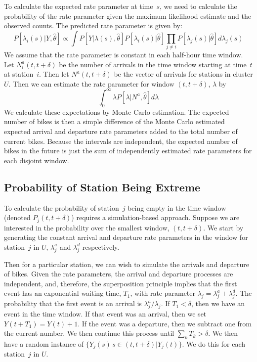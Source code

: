\documentclass{acm_proc_article-sp}
\begin{document}
To calculate the expected rate parameter at time~$s$, we need to calculate the probability of the rate parameter given the maximum likelihood estimate and the observed counts. The predicted rate parameter is given by:
\begin{equation*}
P [ \lambda_i (s) | Y, \hat{\theta} ] \propto \int P [ Y | \lambda (s), \hat{\theta} ] P [ \lambda_i (s) | \hat{\theta} ] \prod_{j \neq i} P [ \lambda_j (s) | \hat{\theta} ] d \lambda_j (s)
\end{equation*}
\noindent We assume that the rate parameter is constant in each half-hour time window.  Let $N^{a}_i(t, t+\delta)$ be the number of arrivals in the time window starting at time~$t$ at station~$i$.  Then let $N^{a} (t, t+\delta)$ be the vector of arrivals for stations in cluster $U$.  Then we can estimate the rate parameter for window $(t, t+\delta)$, $\lambda$ by 
\begin{equation*}
\int_0^\infty \lambda P [ \lambda | N^{a}, \hat{\theta} ] d\lambda
\end{equation*}
\noindent We calculate these expectations by Monte Carlo estimation.  The expected number of bikes is then a simple difference of the Monte Carlo estimated expected arrival and departure rate parameters added to the total number of current bikes.  Because the intervals are independent, the expected number of bikes in the future is just the sum of independently estimated rate parameters for each disjoint window.

\subsection{Probability of Station Being Extreme}

To calculate the probability of station~$j$ being empty in the time window (denoted $P_j (t, t+\delta)$) requires a simulation-based approach.  Suppose we are interested in the probability over the smallest window, $(t, t+\delta)$.  We start by generating the constant arrival and departure rate parameters in the window for station~$j$ in $U$, $\lambda^{a}_j$ and $\lambda^{d}_j$ respectively. 

Then for a particular station, we can wish to simulate the arrivals and departure of bikes.  Given the rate parameters, the arrival and departure processes are independent, and, therefore, the superposition principle implies that the first event has an exponential waiting time, $T_1$, with rate parameter $\lambda_j = \lambda^{a}_j + \lambda^{d}_j$.  The probability that the first event is an arrival is $\lambda^{a}_j / \lambda_j$.   If $T_1 < \delta$, then we have an event in the time window.  If that event was an arrival, then we set $Y(t+T_1) = Y(t) + 1$.  If the event was a departure, then we subtract one from the current number.  We then continue this process until $\sum_{k} T_k > \delta$.  We then have a random instance of $\{ Y_j(s) \, s \in (t, t+\delta) | Y_j(t) \}$.  We do this for each station~$j$ in $U$.
\end{document}
